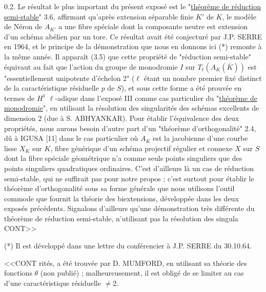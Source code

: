 0.2.  Le résultat le plus important du présent exposé est le "\underline{théorème de réduction semi-stable}" 3.6, affirmant qu'après extension séparable finie $K'$ de $K$, le modèle de Néron de $A_{K'}$ a une fibre spéciale dont la composante neutre est extension d'un schéma abélien par un tore. Ce résultat avait été conjecturé par J.P. SERRE en 1964, et le principe de la démonstration que nous en donnons ici (*) remonte à la même année. Il apparaît (3.5) que cette propriété de "réduction semi-stable" équivaut au fait que l'action du groupe de monodromie $I$ sur $T_\ell(A_K(\overline{K}))$ est "essentiellement unipotente d'échelon 2" ($\ell$ étant un nombre premier fixé distinct de la caractéristique résiduelle $p$ de $S$), et sous cette forme a été prouvée en termes de $H^1$ $\ell$-adique dans l'exposé III comme cas particulier du "\underline{théorème de monodromie}", en utilisant la résolution des singularités des schémas excellents de dimension 2 (due à S. ABHYANKAR). Pour établir l'équivalence des deux propriétés, nous aurons besoin d'autre part d'un "théorème d'orthogonalité" 2.4, dû à IGUSA [11] dans le cas particulier où $A_K$ est la jacobienne d'une courbe lisse $X_K$ sur $K$, fibre générique d'un schéma projectif régulier et connexe $X$ sur $S$ dont la fibre spéciale géométrique n'a comme seuls points singuliers que des points singuliers quadratiques ordinaires. C'est d'ailleurs là un cas de réduction semi-stable, qui ne suffirait pas pour notre propos ; c'est surtout pour établir le théorème d'orthogonalité sous sa forme générale que nous utilisons l'outil commode que fournit la théorie des biextensions, développée dans les deux exposés précédents. Signalons d'ailleurs qu'une démonstration très différente du théorème de réduction semi-stable, n'utilisant pas la résolution des singula CONT>>

(*) Il est développé dans une lettre du conférencier à J.P. SERRE du 30.10.64.



<<CONT rités, a été trouvée par D. MUMFORD, en utilisant sa théorie des fonctions $\theta$ (non publié) ; malheureusement, il est obligé de se limiter au cas d'une caractéristique résiduelle $\neq 2$.

